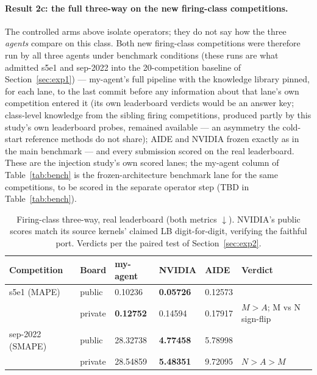 \documentclass[11pt,a4paper]{article}
\newcommand{\dn}{\ensuremath{\downarrow}}
\newcommand{\M}{M}   %
\newcommand{\N}{N}   %
\newcommand{\A}{A}   %
\begin{document}
\paragraph{Result 2c: the full three-way on the new firing-class competitions.} The
controlled arms above isolate operators; they do not say how the three \emph{agents} compare
on this class. Both new firing-class competitions were therefore run by all three agents
under benchmark conditions (these runs are what admitted s5e1 and sep-2022 into the
20-competition baseline of Section~\ref{sec:exp1}) --- my-agent's full pipeline with the
knowledge library pinned, for each lane, to the last commit before any information about that
lane's own competition entered it (its own leaderboard verdicts would be an answer key;
class-level knowledge from the sibling firing competitions, produced partly by this study's
own leaderboard probes, remained available --- an asymmetry the cold-start reference methods
do not share); AIDE and NVIDIA frozen exactly as in the main benchmark --- and every
submission scored on the real leaderboard. These are the injection study's own scored lanes;
the my-agent column of Table~\ref{tab:bench} is the frozen-architecture benchmark lane for the
same competitions, to be scored in the separate operator step (TBD in Table~\ref{tab:bench}).

\begin{table}[H]
\centering\small
\caption{Firing-class three-way, real leaderboard (both metrics \dn). NVIDIA's public
scores match its source kernels' claimed LB digit-for-digit, verifying the faithful port.
Verdicts per the paired test of Section~\ref{sec:exp2}.}
\begin{tabular}{@{}llllll@{}}
\toprule
\textbf{Competition} & \textbf{Board} & \textbf{my-agent} & \textbf{NVIDIA} & \textbf{AIDE} & \textbf{Verdict} \\
\midrule
s5e1 (MAPE) & public & 0.10236 & \textbf{0.05726} & 0.12573 & \\
 & private & \textbf{0.12752} & 0.14594 & 0.17917 & $\M > \A$;\; \M{} vs \N{} sign-flip \\
\midrule
sep-2022 (SMAPE) & public & 28.32738 & \textbf{4.77458} & 5.78998 & \\
 & private & 28.54859 & \textbf{5.48351} & 9.72095 & $\N > \A > \M$ \\
\bottomrule
\end{tabular}
\end{table}
\end{document}
